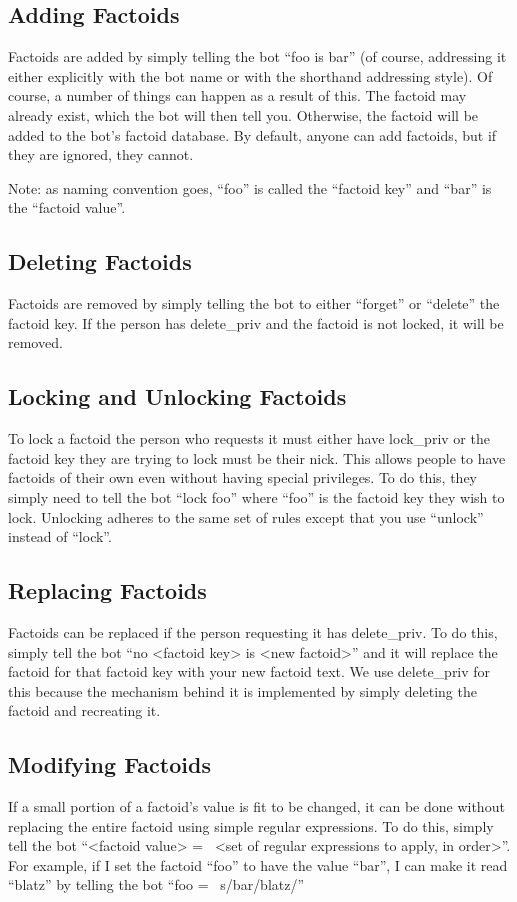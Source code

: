 \documentclass[titlepage]{article}
\begin{document}
		\subsection{Adding Factoids}
			Factoids are added by simply telling the bot ``foo is bar'' (of
			course, addressing it either explicitly with the bot name or with
			the shorthand addressing style).  Of course, a number of things
			can happen as a result of this.  The factoid may already exist,
			which the bot will then tell you.  Otherwise, the factoid will be
			added to the bot's factoid database.  By default, anyone can add
			factoids, but if they are ignored, they cannot.

			Note: as naming convention goes, ``foo'' is called the ``factoid
			key'' and ``bar'' is the ``factoid value''.

		\subsection{Deleting Factoids}
			Factoids are removed by simply telling the bot to either ``forget''
			or ``delete'' the factoid key.  If the person has delete\_priv and
			the factoid is not locked, it will be removed.

		\subsection{Locking and Unlocking Factoids}
			To lock a factoid the person who requests it must either have
			lock\_priv or the factoid key they are trying to lock must be
			their nick.  This allows people to have factoids of their own even
			without having special privileges.  To do this, they simply need
			to tell the bot ``lock foo'' where ``foo'' is the factoid key they
			wish to lock.  Unlocking adheres to the same set of rules except
			that you use ``unlock'' instead of ``lock''.

		\subsection{Replacing Factoids}
			Factoids can be replaced if the person requesting it has
			delete\_priv.  To do this, simply tell the bot ``no <factoid key>
			is <new factoid>'' and it will replace the factoid for that
			factoid key with your new factoid text.  We use delete\_priv for
			this because the mechanism behind it is implemented by simply
			deleting the factoid and recreating it.

		\subsection{Modifying Factoids}
			If a small portion of a factoid's value is fit to be changed, it
			can be done without replacing the entire factoid using simple
			regular expressions.  To do this, simply tell the bot ``<factoid
			value> =~ <set of regular expressions to apply, in order>''.  For
			example, if I set the factoid ``foo'' to have the value ``bar'', I
			can make it read ``blatz'' by telling the bot ``foo =~
			s/bar/blatz/''
\end{document}
